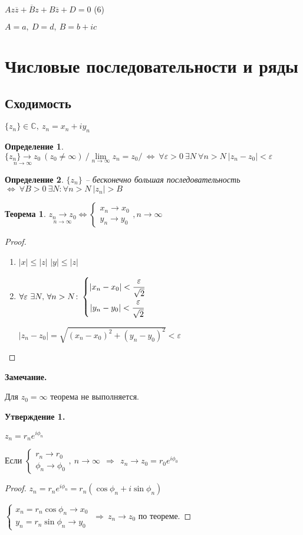 \documentclass[draft]{report}
\newcommand{\forcenewline}{$\phantom{\mbox{newline}}$\newline}
\newcommand{\then}{\ \Rightarrow\ }
\renewcommand{\C}{\mathbb{C}}
\newcommand{\LRA}{\Leftrightarrow}
\renewcommand{\bar}{\overline}
\newcommand{\ninf}[1]{\underset{n\to\infty}{#1}}
\renewcommand{\f}{\phi}
\newcommand{\e}{\varepsilon}
\newcommand{\z}{\bar{z}}
\newcommand{\sys}[1]{\left\{\begin{matrix}#1\end{matrix}\right.}
\newcommand{\opr}[1]{\begin{opred}#1\end{opred}}
\newtheorem*{theor}{Теорема}
\newtheorem*{opred}{Определение}
\theoremstyle{remark}
\begin{document}
$Az\z+\bar{B}z+B\z+D=0$ (6)

$A=a,\ D=d,\ B=b+ic$

\section{Числовые последовательности и ряды}

\subsection{Сходимость}

$\{z_n\}\in\C,\ z_n=x_n+iy_n$

\opr{$\ninf{\{z_n\}\to z_0}\ (z_0\neq\infty)\ /\ninf{\lim}z_n=z_0/\ \LRA\ \forall \e>0\ \exists N\ \forall n>N\ |z_n-z_0|<\e$
}

\opr{$\{z_n\}$ -- бесконечно большая последовательность $\LRA\ \forall B>0\ \exists N\colon \forall n>N\ |z_n|>B$}

\begin{theor}
$\ninf{z_n\to z_0}\LRA\sys{x_n\to x_0 \\ y_n\to y_0},n\to\infty$
\end{theor}

\begin{proof}
\forcenewline
\begin{enumerate}
\item $|x|\leq|z|$
$|y|\leq|z|$
\item $\forall\e\ \exists N,\,\forall n>N\colon
\sys{|x_n-x_0|<\cfrac\e{\sqrt{2}} \\ |y_n-y_0|<\cfrac\e{\sqrt{2}}}$

$|z_n-z_0|=\sqrt{(x_n-x_0)^2+(y_n-y_0)^2}<\e$
\end{enumerate}
\end{proof}

{\bfseries Замечание.}

Для $z_0=\infty$ теорема не выполняется.

{\bfseries Утверждение 1.}

$z_n=r_ne^{i\f_n}$

Если $\sys{r_n\to r_0 \\ \f_n \to \f_0},\ n\to\infty\ \then\ z_n\to z_0=r_0e^{i\f_0}$

\begin{proof}
$z_n=r_ne^{i\f_n}=r_n(\cos\f_n+i\sin\f_n)$

$\sys{x_n=r_n\cos\f_n\to x_0 \\ y_n=r_n\sin\f_n\to y_0}\then z_n\to z_0$ по теореме.
\end{proof}
\end{document}
